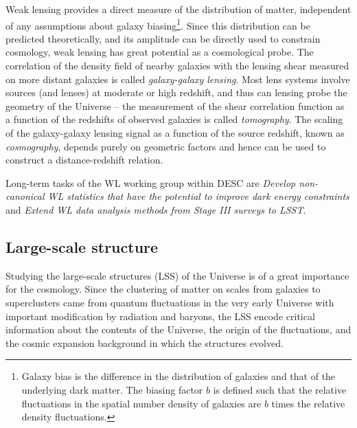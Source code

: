 Weak lensing provides a direct measure of the distribution of matter, independent of any assumptions about galaxy biasing\footnote{Galaxy bias is the difference in the distribution of galaxies and that of the underlying dark matter. The biasing factor $b$ is defined such that the relative fluctuations in the spatial number density of galaxies are $b$ times the relative density fluctuations.}. Since this distribution can be predicted theoretically, and its amplitude can be directly used to constrain cosmology, weak lensing has great potential as a cosmological probe. The correlation of the density field of nearby galaxies with the lensing shear measured on more distant galaxies is called \textit{galaxy-galaxy lensing}. Most lens systems involve sources (and lenses) at moderate or high redshift, and thus can lensing probe the geometry of the Universe -- the measurement of the shear correlation function as a function of the redshifts of observed galaxies is called \textit{tomography}. The scaling of the galaxy-galaxy lensing signal as a function of the source redshift, known as \textit{cosmography}, depends purely on geometric factors and hence can be used to construct a distance-redshift relation.

Long-term tasks of the WL working group within DESC are \textit{Develop non-canonical WL statistics that have the potential to improve
dark energy constraints} and \textit{Extend WL data analysis methods from Stage III surveys to LSST}.
\subsection{Large-scale structure}
Studying the large-scale structures (LSS) of the Universe is of a great importance for the cosmology. Since the clustering of matter on scales from galaxies to superclusters came from quantum fluctuations in the very early Universe with important modification by radiation and baryons, the LSS encode critical information about the contents of the Universe, the origin of the fluctuations, and the cosmic expansion background in which the structures evolved.

